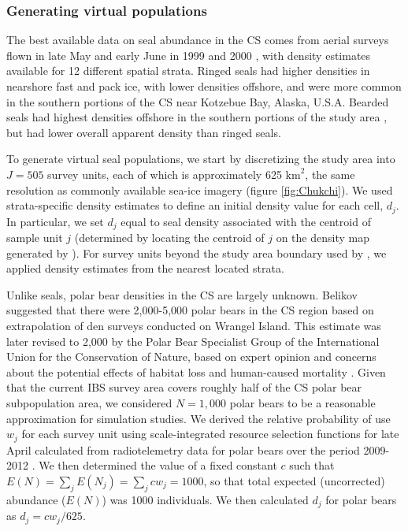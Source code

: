 \documentclass[]{rsos}%
\begin{document}
\subsubsection{Generating virtual populations}

The best available data on seal abundance in the CS comes from aerial surveys flown in late May and early June in 1999 and 2000 \cite{Bengtson2005}, with density estimates available for 12 different spatial strata. Ringed seals had higher densities in nearshore fast and pack ice, with lower densities offshore, and were more common in the southern portions of the CS near Kotzebue Bay, Alaska, U.S.A.  Bearded seals had highest densities offshore in the southern portions of the study area \cite{Bengtson2005}, but had lower overall apparent density than ringed seals.

To generate virtual seal populations, we start by discretizing the study area into $J=505$ survey units, each of which is approximately 625 $\text{km}^2$, the same resolution as commonly available sea-ice imagery (figure \ref{fig:Chukchi}). We used strata-specific density estimates to define an initial density value for each cell, $d_j$. In particular, we set $d_j$ equal to seal density associated with the centroid of sample unit $j$ (determined by locating the centroid of $j$ on the density map generated by \cite{Bengtson2005}).  For survey units beyond the study area boundary used by \cite{Bengtson2005}, we applied density estimates from the nearest located strata.

Unlike seals, polar bear densities in the CS are largely unknown. Belikov \cite{Belikov1992} suggested that there were 2,000-5,000 polar bears in the CS region based on extrapolation of den surveys conducted on Wrangel Island. This estimate was later revised to 2,000 by the Polar Bear Specialist Group of the International Union for the Conservation of Nature, based on expert opinion and concerns about the potential effects of habitat loss and human-caused mortality \cite{AarsEtAl2006}. Given that the current IBS survey area covers roughly half of the CS polar bear subpopulation area, we considered $N = 1,000$ polar bears to be a reasonable approximation for simulation studies. We derived the relative probability of use $w_j$ for each survey unit using scale-integrated resource selection functions for late April calculated from radiotelemetry data for polar bears over the period 2009-2012 \cite{WilsonEtAl2014}.
We then determined the value of a fixed constant $c$ such that $E(N) = \sum_j E(N_j) = \sum_j c w_j = 1000$,  so that total expected (uncorrected) abundance ($E(N)$) was 1000 individuals.  We then calculated $d_j$ for polar bears as $d_j = c w_j /625$.
\end{document}
